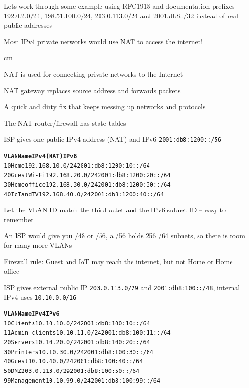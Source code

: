 \documentclass[Screen16to9,17pt]{foils}
\begin{document}
Lets work through some example using RFC1918 and documentation prefixes 192.0.2.0/24, 198.51.100.0/24, 203.0.113.0/24 and 2001:db8::/32 instead of real public addresses

Most IPv4 private networks would use NAT to access the internet!





 cm
\begin{list2}
\item NAT is used for connecting private networks to the Internet
\item NAT gateway replaces source address and forwards packets
\item A quick and dirty fix that keeps messing up networks and protocols
\item The NAT router/firewall has state tables
\end{list2}


  ISP gives one public IPv4 address (NAT) and IPv6 \verb+2001:db8:1200::/56+

  \begin{alltt}\small
  \textbf{VLAN Name         IPv4 (NAT)        IPv6}
  10   Home         192.168.10.0/24   2001:db8:1200:10::/64
  20   Guest Wi-Fi  192.168.20.0/24   2001:db8:1200:20::/64
  30   Home office  192.168.30.0/24   2001:db8:1200:30::/64
  40   IoT and TV   192.168.40.0/24   2001:db8:1200:40::/64
  \end{alltt}

  \begin{list2}
  \item Let the VLAN ID match the third octet and the IPv6 subnet ID -- easy to remember
  \item An ISP would give you /48 or /56, a /56 holds 256 /64 subnets, so there is room for many more VLANs
  \item Firewall rule: Guest and IoT may reach the internet, but not Home or Home office
  \end{list2}


ISP gives external public IP \verb+203.0.113.0/29+ and \verb+2001:db8:100::/48+, internal IPv4 uses \verb+10.10.0.0/16+

\begin{alltt}\small
\textbf{VLAN Name          IPv4              IPv6}
10   Clients       10.10.10.0/24     2001:db8:100:10::/64
11   Admin_clients 10.10.11.0/24     2001:db8:100:11::/64
20   Servers       10.10.20.0/24     2001:db8:100:20::/64
30   Printers      10.10.30.0/24     2001:db8:100:30::/64
40   Guest         10.10.40.0/24     2001:db8:100:40::/64
50   DMZ           203.0.113.0/29    2001:db8:100:50::/64
99   Management    10.10.99.0/24     2001:db8:100:99::/64
\end{alltt}
\end{document}
